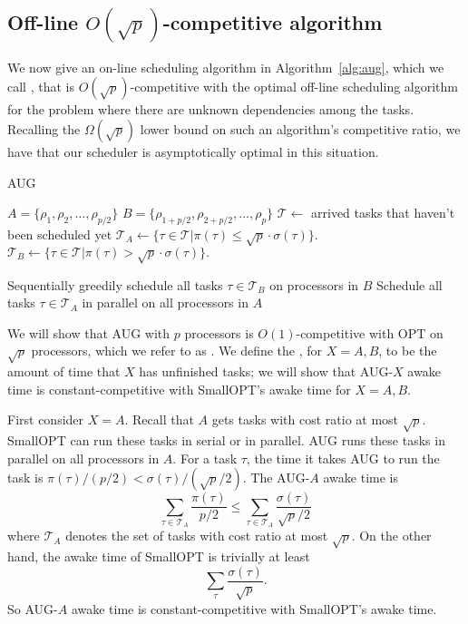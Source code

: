 \subsection{Off-line $O(\sqrt{p})$-competitive algorithm}
We now give an on-line scheduling algorithm in
Algorithm~\ref{alg:aug}, which we call , that is
$O(\sqrt{p})$-competitive with the optimal off-line scheduling
algorithm for the problem where there are unknown dependencies
among the tasks.
Recalling the $\Omega(\sqrt{p})$ lower bound on such an
algorithm's competitive ratio, we have that our scheduler is
asymptotically optimal in this situation.

\begin{algorithm}
  \caption{AUG}
  \label{alg:aug}
  \begin{algorithmic}
    \State $A = \{\rho_1, \rho_2, \ldots, \rho_{p/2} \}$
    \State $B = \{\rho_{1+p/2}, \rho_{2+p/2}, \ldots, \rho_{p} \}$
    \State
    \State $\mathcal{T} \gets$ arrived tasks that haven't been scheduled yet
    \State $\mathcal{T}_A \gets \{ \tau \in \mathcal{T} | \pi(\tau) \le \sqrt{p} \cdot \sigma(\tau) \}.$
    \State $\mathcal{T}_B \gets \{ \tau\in \mathcal{T}  | \pi(\tau) > \sqrt{p} \cdot \sigma(\tau) \}.$
    \State
    
      \State Sequentially greedily schedule all tasks $\tau \in \mathcal{T}_B$ on processors in $B$
    \EndIf
    \State Schedule all tasks $\tau \in \mathcal{T}_A$ in parallel on all processors in $A$

  \end{algorithmic}
\end{algorithm}

We will show that AUG with $p$ processors is $O(1)$-competitive
with OPT on $\sqrt{p}$ processors, which we refer to as
. We define the , for $X=A,B$, to be the amount of time that $X$ has
unfinished tasks; we will show that AUG-$X$ awake time is
constant-competitive with SmallOPT's awake time for $X=A,B$.

First consider $X=A$. Recall that $A$ gets tasks with cost ratio
at most $\sqrt{p}$. SmallOPT can run these tasks in serial or in
parallel. AUG runs these tasks in parallel on all processors in
$A$. For a task $\tau$, the time it takes AUG to run the task is
$\pi(\tau)/(p/2) < \sigma(\tau)/ (\sqrt{p}/2)$. The AUG-$A$ awake
time is 
$$\sum_{\tau \in \mathcal{T}_A} \frac{\pi(\tau)}{p/2} \le \sum_{\tau \in \mathcal{T}_A} \frac{\sigma(\tau)}{\sqrt{p}/2}$$
where $\mathcal{T}_A$ denotes the set of tasks with cost ratio at most $\sqrt{p}$.
On the other hand, the awake time of SmallOPT is trivially at least 
$$\sum_{\tau} \frac{\sigma(\tau)}{\sqrt{p}}.$$
So AUG-$A$ awake time is constant-competitive with SmallOPT's awake time.

